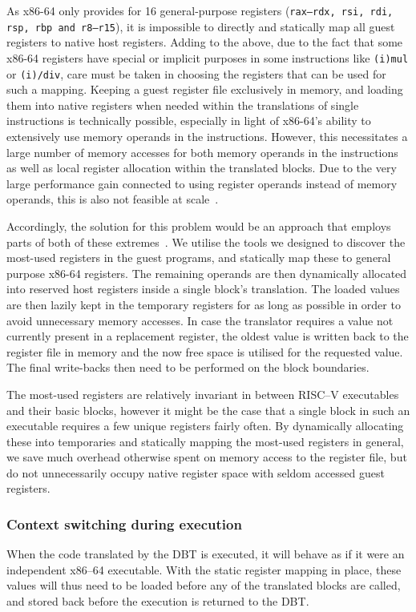 As x86-64 only provides for 16 general-purpose registers (\texttt{rax--rdx, rsi, rdi, rsp, rbp and r8--r15}), it is impossible to directly and statically map all guest registers to native host registers.
Adding to the above, due to the fact that some x86-64 registers have special or implicit purposes in some instructions like \texttt{(i)mul} or \texttt{(i)/div}, care must be taken in choosing the registers that can be used for such a mapping.
Keeping a guest register file exclusively in memory, and loading them into native registers when needed within the translations of single instructions is technically possible, especially in light of x86-64's ability to extensively use memory operands in the instructions.
However, this necessitates a large number of memory accesses for both memory operands in the instructions as well as local register allocation within the translated blocks.
Due to the very large performance gain connected to using register operands instead of memory operands, this is also not feasible at scale~\cite[S. 8f.]{bintrans}.

Accordingly, the solution for this problem would be an approach that employs parts of both of these extremes~\cite[S. 9]{bintrans}.
We utilise the tools we designed to discover the most-used registers in the guest programs, and statically map these to general purpose x86-64 registers.
The remaining operands are then dynamically allocated into reserved host registers inside a single block's translation.
The loaded values are then lazily kept in the temporary registers for as long as possible in order to avoid unnecessary memory accesses.
In case the translator requires a value not currently present in a replacement register, the oldest value is written back to the register file in memory and the now free space is utilised for the requested value.
The final write-backs then need to be performed on the block boundaries.

The most-used registers are relatively invariant in between RISC--V executables and their basic blocks, however it might be the case that a single block in such an executable requires a few unique registers fairly often.
By dynamically allocating these into temporaries and statically mapping the most-used registers in general, we save much overhead otherwise spent on memory access to the register file, but do not unnecessarily occupy native register space with seldom accessed guest registers.

\subsubsection{Context switching during execution}
When the code translated by the DBT is executed, it will behave as if it were an independent x86--64 executable.
With the static register mapping in place, these values will thus need to be loaded before any of the translated blocks are called, and stored back before the execution is returned to the DBT\@.

